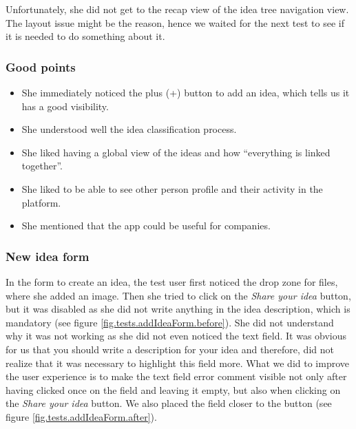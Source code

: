 \documentclass[a4paper,12pt,twoside]{article}
\begin{document}
Unfortunately, she did not get to the recap view of the idea tree navigation view.
The layout issue might be the reason, hence we waited for the next test to see if it is needed to do something about it.

\subsubsection*{Good points}
\begin{itemize}
    \item She immediately noticed the plus (+) button to add an idea, which tells us it has a good visibility.
    \item She understood well the idea classification process.
    \item She liked having a global view of the ideas and how “everything is linked together”.
    \item She liked to be able to see other person profile and their activity in the platform.
    \item She mentioned that the app could be useful for companies.
\end{itemize}

\subsubsection*{New idea form}
In the form to create an idea, the test user first noticed the drop zone for files, where she added an image.
Then she tried to click on the \emph{Share your idea} button, but it was disabled as she did not write anything in the idea description, which is mandatory (see figure \ref{fig.tests.addIdeaForm.before}).
She did not understand why it was not working as she did not even noticed the text field.
It was obvious for us that you should write a description for your idea and therefore, did not realize that it was necessary to highlight this field more.
What we did to improve the user experience is to make the text field error comment visible not only after having clicked once on the field and leaving it empty, but also when clicking on the \emph{Share your idea} button.
We also placed the field closer to the button (see figure \ref{fig.tests.addIdeaForm.after}).
\end{document}
